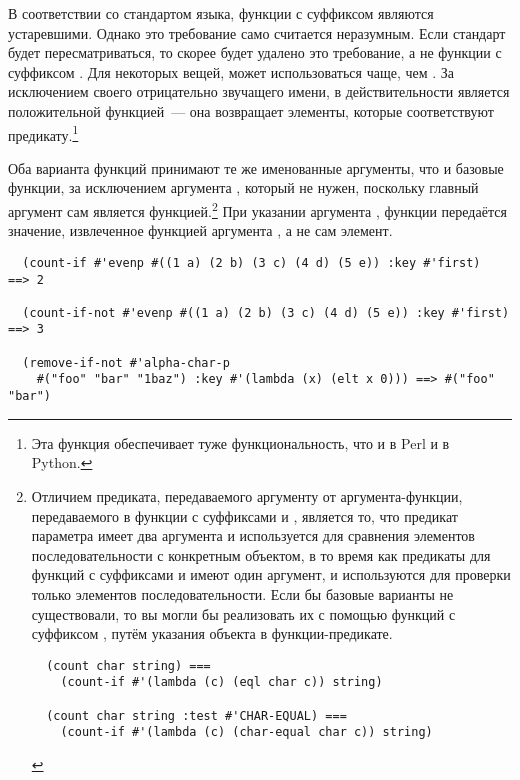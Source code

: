 В соответствии со стандартом языка, функции с суффиксом  являются
устаревшими.  Однако это требование само считается неразумным.  Если стандарт будет
пересматриваться, то скорее будет удалено это требование, а не функции с суффиксом
.  Для некоторых вещей,  может использоваться чаще, чем
.  За исключением своего отрицательно звучащего имени, в действительности
 является положительной функцией~--- она возвращает элементы, которые
соответствуют предикату.\footnote{Эта функция обеспечивает туже функциональность, что и
   в Perl и  в Python.}

Оба варианта функций принимают те же именованные аргументы, что и базовые функции, за
исключением аргумента , который не нужен, поскольку главный аргумент сам
является функцией.\footnote{Отличием предиката, передаваемого аргументу  от
  аргумента-функции, передаваемого в функции с суффиксами  и ,
  является то, что предикат параметра  имеет два аргумента и используется для
  сравнения элементов последовательности с конкретным объектом, в то время как предикаты
  для функций с суффиксами  и  имеют один аргумент, и используются
  для проверки только элементов последовательности.  Если бы базовые варианты не
  существовали, то вы могли бы реализовать их с помощью функций с суффиксом ,
  путём указания объекта в функции-предикате.

\begin{verbatim}
  (count char string) ===
    (count-if #'(lambda (c) (eql char c)) string)
  
  (count char string :test #'CHAR-EQUAL) ===
    (count-if #'(lambda (c) (char-equal char c)) string)
\end{verbatim}

}  При указании аргумента , функции передаётся значение, извлеченное функцией
аргумента , а не сам элемент.

\begin{verbatim}
  (count-if #'evenp #((1 a) (2 b) (3 c) (4 d) (5 e)) :key #'first)     ==> 2

  (count-if-not #'evenp #((1 a) (2 b) (3 c) (4 d) (5 e)) :key #'first) ==> 3

  (remove-if-not #'alpha-char-p
    #("foo" "bar" "1baz") :key #'(lambda (x) (elt x 0))) ==> #("foo" "bar")
\end{verbatim}

